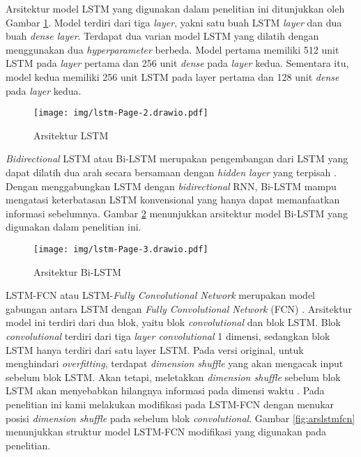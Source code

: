 






Arsitektur model LSTM yang digunakan dalam penelitian ini ditunjukkan oleh Gambar \ref{fig:arslstm}. Model terdiri dari tiga \textit{layer}, yakni satu buah LSTM \textit{layer} dan dua buah \textit{dense layer}. Terdapat dua varian model LSTM yang dilatih dengan menggunakan dua \textit{hyperparameter} berbeda. Model pertama memiliki 512 unit LSTM pada \textit{layer} pertama dan 256 unit \textit{dense} pada \textit{layer} kedua. Sementara itu, model kedua memiliki 256 unit LSTM pada layer pertama dan 128 unit \textit{dense} pada \textit{layer} kedua.

\begin{figure}[H]
  \centering
  \texttt{[image: img/lstm-Page-2.drawio.pdf]}
  \caption{Arsitektur LSTM}
  \label{fig:arslstm}
\end{figure}

\textit{Bidirectional} LSTM atau Bi-LSTM merupakan pengembangan dari LSTM yang dapat dilatih dua arah secara bersamaan dengan \textit{hidden layer} yang terpisah \parencite{yuReviewRecurrentNeural2019}. Dengan menggabungkan LSTM dengan \textit{bidirectional} RNN, Bi-LSTM mampu mengatasi keterbatasan LSTM konvensional yang hanya dapat memanfaatkan informasi sebelumnya. Gambar \ref{fig:arsbilstm} menunjukkan arsitektur model Bi-LSTM yang digunakan dalam penelitian ini.

\begin{figure}[H]
  \centering
  \texttt{[image: img/lstm-Page-3.drawio.pdf]}
  \caption{Arsitektur Bi-LSTM}
  \label{fig:arsbilstm}
\end{figure}

LSTM-FCN atau LSTM-\textit{Fully Convolutional Network} merupakan model gabungan antara LSTM dengan  \textit{Fully Convolutional Network} (FCN) \parencite{karimLSTMFullyConvolutional2018}. Arsitektur model ini terdiri dari dua blok, yaitu blok \textit{convolutional} dan blok LSTM. Blok \textit{convolutional} terdiri dari tiga \textit{layer convolutional} 1 dimensi, sedangkan blok LSTM hanya terdiri dari satu layer LSTM. Pada versi original, untuk menghindari \textit{overfitting}, terdapat \textit{dimension shuffle} yang akan mengacak input sebelum blok LSTM. Akan tetapi, meletakkan \textit{dimension shuffle} sebelum blok LSTM akan menyebabkan hilangnya informasi pada dimensi waktu \parencite{8713870}. Pada penelitian ini kami melakukan modifikasi pada LSTM-FCN dengan menukar posisi \textit{dimension shuffle} pada sebelum blok \textit{convolutional}. Gambar \ref{fig:arslstmfcn} menunjukkan struktur model LSTM-FCN modifikasi yang digunakan pada penelitian.

